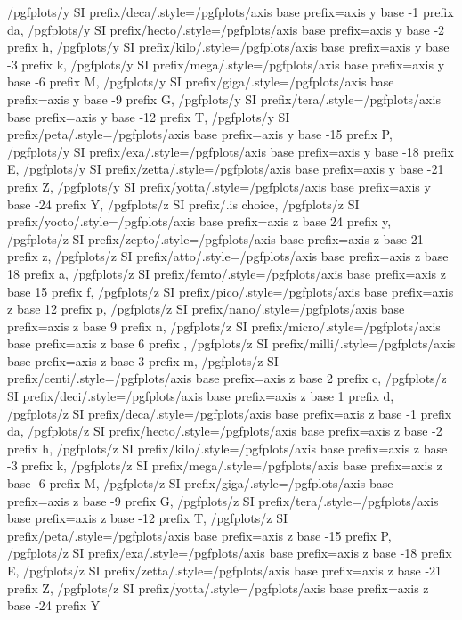 {    /pgfplots/y SI prefix/deca/.style={/pgfplots/axis base prefix={axis y base -1 prefix da}},%
    /pgfplots/y SI prefix/hecto/.style={/pgfplots/axis base prefix={axis y base -2 prefix h}},%
    /pgfplots/y SI prefix/kilo/.style={/pgfplots/axis base prefix={axis y base -3 prefix k}},%
    /pgfplots/y SI prefix/mega/.style={/pgfplots/axis base prefix={axis y base -6 prefix M}},%
    /pgfplots/y SI prefix/giga/.style={/pgfplots/axis base prefix={axis y base -9 prefix G}},%
    /pgfplots/y SI prefix/tera/.style={/pgfplots/axis base prefix={axis y base -12 prefix T}},%
    /pgfplots/y SI prefix/peta/.style={/pgfplots/axis base prefix={axis y base -15 prefix P}},%
    /pgfplots/y SI prefix/exa/.style={/pgfplots/axis base prefix={axis y base -18 prefix E}},%
    /pgfplots/y SI prefix/zetta/.style={/pgfplots/axis base prefix={axis y base -21 prefix Z}},%
    /pgfplots/y SI prefix/yotta/.style={/pgfplots/axis base prefix={axis y base -24 prefix Y}},%
    /pgfplots/z SI prefix/.is choice,%
    /pgfplots/z SI prefix/yocto/.style={/pgfplots/axis base prefix={axis z base 24 prefix y}},%
    /pgfplots/z SI prefix/zepto/.style={/pgfplots/axis base prefix={axis z base 21 prefix z}},%
    /pgfplots/z SI prefix/atto/.style={/pgfplots/axis base prefix={axis z base 18 prefix a}},%
    /pgfplots/z SI prefix/femto/.style={/pgfplots/axis base prefix={axis z base 15 prefix f}},%
    /pgfplots/z SI prefix/pico/.style={/pgfplots/axis base prefix={axis z base 12 prefix p}},%
    /pgfplots/z SI prefix/nano/.style={/pgfplots/axis base prefix={axis z base 9 prefix n}},%
    /pgfplots/z SI prefix/micro/.style={/pgfplots/axis base prefix={axis z base 6 prefix \mu}},%
    /pgfplots/z SI prefix/milli/.style={/pgfplots/axis base prefix={axis z base 3 prefix m}},%
    /pgfplots/z SI prefix/centi/.style={/pgfplots/axis base prefix={axis z base 2 prefix c}},%
    /pgfplots/z SI prefix/deci/.style={/pgfplots/axis base prefix={axis z base 1 prefix d}},%
    /pgfplots/z SI prefix/deca/.style={/pgfplots/axis base prefix={axis z base -1 prefix da}},%
    /pgfplots/z SI prefix/hecto/.style={/pgfplots/axis base prefix={axis z base -2 prefix h}},%
    /pgfplots/z SI prefix/kilo/.style={/pgfplots/axis base prefix={axis z base -3 prefix k}},%
    /pgfplots/z SI prefix/mega/.style={/pgfplots/axis base prefix={axis z base -6 prefix M}},%
    /pgfplots/z SI prefix/giga/.style={/pgfplots/axis base prefix={axis z base -9 prefix G}},%
    /pgfplots/z SI prefix/tera/.style={/pgfplots/axis base prefix={axis z base -12 prefix T}},%
    /pgfplots/z SI prefix/peta/.style={/pgfplots/axis base prefix={axis z base -15 prefix P}},%
    /pgfplots/z SI prefix/exa/.style={/pgfplots/axis base prefix={axis z base -18 prefix E}},%
    /pgfplots/z SI prefix/zetta/.style={/pgfplots/axis base prefix={axis z base -21 prefix Z}},%
    /pgfplots/z SI prefix/yotta/.style={/pgfplots/axis base prefix={axis z base -24 prefix Y}}%
}
%
%
\def\pgfplots@label@units#1{%
    \pgfkeysgetvalue{/pgfplots/#1label}{\pgfplots@loc@TMPa}%
    \pgfplots@loc@TMPa\space\pgfplots@label@units@@{#1}%
}


